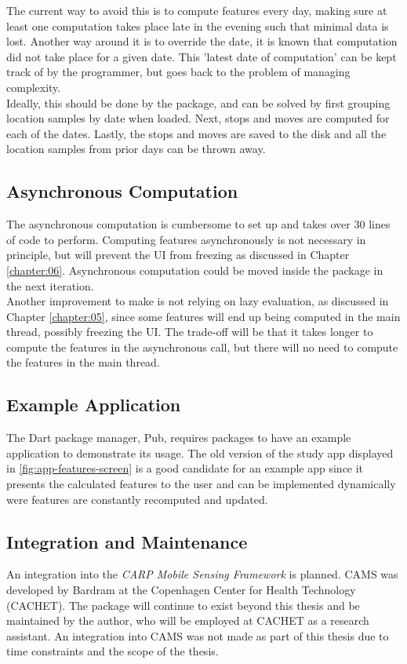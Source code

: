 The current way to avoid this is to compute features every day, making sure at least one computation takes place late in the evening such that minimal data is lost. Another way around it is to override the date, it is known that computation did not take place for a given date. This 'latest date of computation' can be kept track of by the programmer, but goes back to the problem of managing complexity. \\

Ideally, this should be done by the package, and can be solved by first grouping location samples by date when loaded. Next, stops and moves are computed for each of the dates. Lastly, the stops and moves are saved to the disk and all the location samples from prior days can be thrown away.

\subsection{Asynchronous Computation}
The asynchronous computation is cumbersome to set up and takes over 30 lines of code to perform. Computing features asynchronously is not necessary in principle, but will prevent the UI from freezing as discussed in Chapter \ref{chapter:06}. Asynchronous computation could be moved inside the package in the next iteration.\\

Another improvement to make is not relying on lazy evaluation, as discussed in Chapter \ref{chapter:05}, since some features will end up being computed in the main thread, possibly freezing the UI. The trade-off will be that it takes longer to compute the features in the asynchronous call, but there will no need to compute the features in the main thread.

\subsection{Example Application}
The Dart package manager, Pub, requires packages to have an example application to demonstrate its usage. The old version of the study app displayed in \ref{fig:app-features-screen} is a good candidate for an example app since it presents the calculated features to the user and can be implemented dynamically were features are constantly recomputed and updated.

\subsection{Integration and Maintenance}
An integration into the \textit{CARP Mobile Sensing Framework} is planned. CAMS was developed by Bardram \cite{CAMS} at the Copenhagen Center for Health Technology (CACHET). The package will continue to exist beyond this thesis and  be maintained by the author, who will be employed at CACHET as a research assistant. An integration into CAMS was not made as part of this thesis due to time constraints and the scope of the thesis. \\

